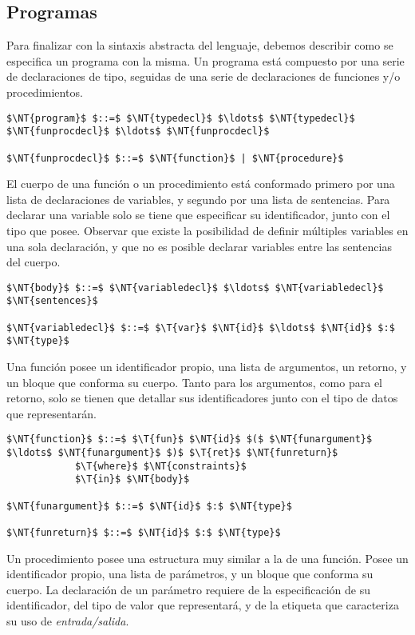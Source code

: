 \subsection{Programas}

Para finalizar con la sintaxis abstracta del lenguaje, debemos describir como se especifica un programa con la misma.
Un programa está compuesto por una serie de declaraciones de tipo, seguidas de una serie de declaraciones de funciones y/o procedimientos.

\begin{lstlisting}[style = syntax]
$\NT{program}$ $::=$ $\NT{typedecl}$ $\ldots$ $\NT{typedecl}$ $\NT{funprocdecl}$ $\ldots$ $\NT{funprocdecl}$

$\NT{funprocdecl}$ $::=$ $\NT{function}$ | $\NT{procedure}$
\end{lstlisting}

El cuerpo de una función o un procedimiento está conformado primero por una lista de declaraciones de variables, y segundo por una lista de sentencias.
Para declarar una variable solo se tiene que especificar su identificador, junto con el tipo que posee.
Observar que existe la posibilidad de definir múltiples variables en una sola declaración, y que no es posible declarar variables entre las sentencias del cuerpo.

\begin{lstlisting}[style = syntax]
$\NT{body}$ $::=$ $\NT{variabledecl}$ $\ldots$ $\NT{variabledecl}$ $\NT{sentences}$

$\NT{variabledecl}$ $::=$ $\T{var}$ $\NT{id}$ $\ldots$ $\NT{id}$ $:$ $\NT{type}$
\end{lstlisting}

Una función posee un identificador propio, una lista de argumentos, un retorno, y un bloque que conforma su cuerpo.
Tanto para los argumentos, como para el retorno, solo se tienen que detallar sus identificadores junto con el tipo de datos que representarán.

\begin{lstlisting}[style = syntax]
$\NT{function}$ $::=$ $\T{fun}$ $\NT{id}$ $($ $\NT{funargument}$ $\ldots$ $\NT{funargument}$ $)$ $\T{ret}$ $\NT{funreturn}$
            $\T{where}$ $\NT{constraints}$
            $\T{in}$ $\NT{body}$

$\NT{funargument}$ $::=$ $\NT{id}$ $:$ $\NT{type}$

$\NT{funreturn}$ $::=$ $\NT{id}$ $:$ $\NT{type}$
\end{lstlisting}

Un procedimiento posee una estructura muy similar a la de una función.
Posee un identificador propio, una lista de parámetros, y un bloque que conforma su cuerpo.
La declaración de un parámetro requiere de la especificación de su identificador, del tipo de valor que representará, y de la etiqueta que caracteriza su uso de \textit{entrada/salida}.

